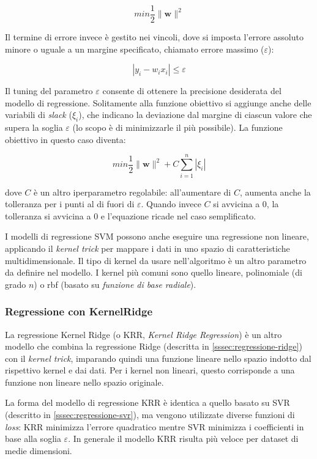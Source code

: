 $$min \frac{1}{2}\|\mathbf{w}\|^{2}$$\smallskip

 Il termine di errore invece è gestito nei vincoli, dove si imposta l'errore assoluto minore o uguale a un margine specificato, chiamato errore massimo ($\varepsilon$):
 
 $$\left|y_{i}-w_{i} x_{i}\right| \leq \varepsilon$$\smallskip
 
 Il tuning del parametro $\varepsilon$ consente di ottenere la precisione desiderata del modello di regressione. Solitamente alla funzione obiettivo si aggiunge anche delle variabili di \textit{slack} ($\xi_{i}$), che indicano la deviazione dal margine di ciascun valore che supera la soglia $\varepsilon$ (lo scopo è di minimizzarle il più possibile). La funzione obiettivo in questo caso diventa:
 
 $$min \frac{1}{2}\|\mathbf{w}\|^{2} + C \sum_{i=1}^{n}\left|\xi_{i}\right|$$\smallskip

dove $C$ è un altro iperparametro regolabile: all'aumentare di $C$, aumenta anche la tolleranza per i punti al di fuori di $\varepsilon$. Quando invece $C$ si avvicina a 0, la tolleranza si avvicina a 0 e l'equazione ricade nel caso semplificato.

I modelli di regressione SVM possono anche eseguire una regressione non lineare, applicando il \textit{kernel trick} per mappare i dati in uno spazio di caratteristiche multidimensionale. Il tipo di kernel da usare nell'algoritmo è un altro parametro da definire nel modello. I kernel più comuni sono quello lineare, polinomiale (di grado $n$) o rbf (basato su \textit{funzione di base radiale}).

\subsubsection{Regressione con KernelRidge}\label{sssec:regressione-kridge}
La regressione Kernel Ridge (o KRR, \textit{Kernel Ridge Regression}) è un altro modello che combina la regressione Ridge (descritta in \ref{sssec:regressione-ridge}) con il \textit{kernel trick}, imparando quindi una funzione lineare nello spazio indotto dal rispettivo kernel e dai dati. Per i kernel non lineari, questo corrisponde a una funzione non lineare nello spazio originale. \cite{krr}

La forma del modello di regressione KRR è identica a quello basato su SVR (descritto in \ref{sssec:regressione-svr}), ma vengono utilizzate diverse funzioni di \textit{loss}: KRR minimizza l'errore quadratico mentre SVR minimizza i coefficienti in base alla soglia $\varepsilon$. In generale il modello KRR risulta più veloce per dataset di medie dimensioni. %

